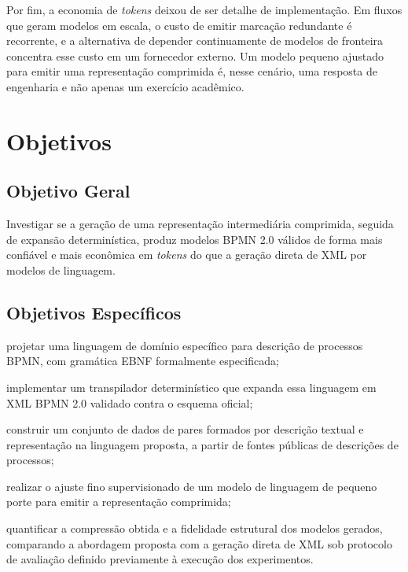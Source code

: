 Por fim, a economia de \textit{tokens} deixou de ser detalhe de implementação. Em fluxos que geram modelos em escala, o custo de emitir marcação redundante é recorrente, e a alternativa de depender continuamente de modelos de fronteira concentra esse custo em um fornecedor externo. Um modelo pequeno ajustado para emitir uma representação comprimida é, nesse cenário, uma resposta de engenharia e não apenas um exercício acadêmico.

\section{Objetivos}
\label{sec:objetivos}

\subsection{Objetivo Geral}
\label{sec:objetivo-geral}

Investigar se a geração de uma representação intermediária comprimida, seguida de expansão determinística, produz modelos BPMN 2.0 válidos de forma mais confiável e mais econômica em \textit{tokens} do que a geração direta de XML por modelos de linguagem.

\subsection{Objetivos Específicos}
\label{sec:objetivos-especificos}

	\begin{alineas}
		\item projetar uma linguagem de domínio específico para descrição de processos BPMN, com gramática EBNF formalmente especificada;
		\item implementar um transpilador determinístico que expanda essa linguagem em XML BPMN 2.0 validado contra o esquema oficial;
		\item construir um conjunto de dados de pares formados por descrição textual e representação na linguagem proposta, a partir de fontes públicas de descrições de processos;
		\item realizar o ajuste fino supervisionado de um modelo de linguagem de pequeno porte para emitir a representação comprimida;
		\item quantificar a compressão obtida e a fidelidade estrutural dos modelos gerados, comparando a abordagem proposta com a geração direta de XML sob protocolo de avaliação definido previamente à execução dos experimentos.
	\end{alineas}


